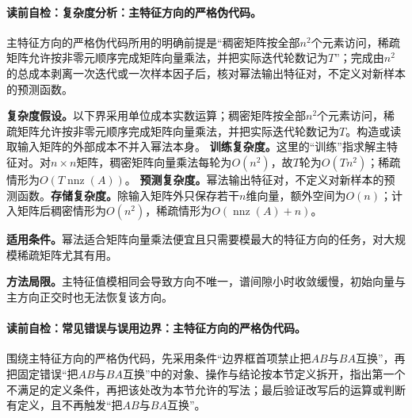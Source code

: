 \paragraph{读前自检：复杂度分析：主特征方向的严格伪代码。}主特征方向的严格伪代码所用的明确前提是“稠密矩阵按全部$n^2$个元素访问，稀疏矩阵允许按非零元顺序完成矩阵向量乘法，并把实际迭代轮数记为$T$”；完成由$n^2$的总成本剥离一次迭代或一次样本因子后，核对幂法输出特征对，不定义对新样本的预测函数。\par

\begin{complexitybox}
\textbf{复杂度假设。}以下界采用单位成本实数运算；稠密矩阵按全部$n^2$个元素访问，稀疏矩阵允许按非零元顺序完成矩阵向量乘法，并把实际迭代轮数记为$T$。构造或读取输入矩阵的外部成本不并入幂法本身。
\label{schema:V1-C02:CH-26}
\textbf{训练复杂度。}这里的“训练”指求解主特征对。对$n\times n$矩阵，稠密矩阵向量乘法每轮为$O(n^2)$，故$T$轮为$O(Tn^2)$；稀疏情形为$O(T\operatorname{nnz}(A))$。
\label{schema:V1-C02:CH-27}
\textbf{预测复杂度。}幂法输出特征对，不定义对新样本的预测函数。\textbf{存储复杂度。}除输入矩阵外只保存若干$n$维向量，额外空间为$O(n)$；计入矩阵后稠密情形为$O(n^2)$，稀疏情形为$O(\operatorname{nnz}(A)+n)$。
\end{complexitybox}
\begin{applicabilitybox}\label{schema:V1-C02:CH-28}
\textbf{适用条件。}幂法适合矩阵向量乘法便宜且只需要模最大的特征方向的任务，对大规模稀疏矩阵尤其有用。\par
{}\label{schema:V1-C02:CH-29}
\textbf{方法局限。}主特征值模相同会导致方向不唯一，谱间隙小时收敛缓慢，初始向量与主方向正交时也无法恢复该方向。
\end{applicabilitybox}
\paragraph{读前自检：常见错误与误用边界：主特征方向的严格伪代码。}围绕主特征方向的严格伪代码，先采用条件“边界框首项禁止把$AB$与$BA$互换”，再把固定错误“把$AB$与$BA$互换”中的对象、操作与结论按本节定义拆开，指出第一个不满足的定义条件，再把该处改为本节允许的写法；最后验证改写后的运算或判断有定义，且不再触发“把$AB$与$BA$互换”。\par

